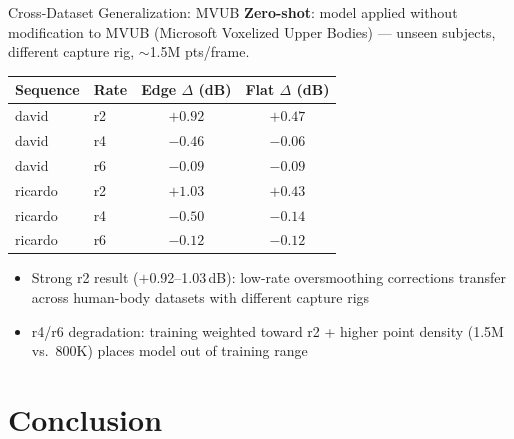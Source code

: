 \documentclass[aspectratio=169]{beamer}
\begin{document}
\begin{frame}{Cross-Dataset Generalization: MVUB}
  \textbf{Zero-shot}: model applied without modification to MVUB (Microsoft Voxelized
  Upper Bodies) — unseen subjects, different capture rig, $\sim$1.5M pts/frame.

  \vspace{8pt}
  \begin{center}
    \begin{tabular}{llcc}
      \toprule
      Sequence & Rate & Edge $\Delta$ (dB) & Flat $\Delta$ (dB) \\
      \midrule
      david   & r2 & $\mathbf{+0.92}$ & $\mathbf{+0.47}$ \\
      david   & r4 & $-0.46$ & $-0.06$ \\
      david   & r6 & $-0.09$ & $-0.09$ \\
      ricardo & r2 & $\mathbf{+1.03}$ & $\mathbf{+0.43}$ \\
      ricardo & r4 & $-0.50$ & $-0.14$ \\
      ricardo & r6 & $-0.12$ & $-0.12$ \\
      \bottomrule
    \end{tabular}
  \end{center}
  \vspace{8pt}
  \begin{itemize}
    \item Strong r2 result ($+$0.92--1.03\,dB): low-rate oversmoothing corrections
          transfer across human-body datasets with different capture rigs
    \item r4/r6 degradation: training weighted toward r2 + higher point density
          (1.5M vs.\ 800K) places model out of training range
  \end{itemize}
\end{frame}

\section{Conclusion}
\end{document}
